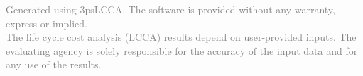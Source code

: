 \documentclass[12pt]{article}
\begin{document}
\begin{titlepage}
\vspace{1.2cm}


\vspace{0.5cm}

{\raggedright
\small
\textcolor{gray}{
Generated using 3psLCCA. The software is provided without any warranty, express or implied.\\
The life cycle cost analysis (LCCA) results depend on user-provided inputs. 
The evaluating agency is solely responsible for the accuracy of the input data and for any use of the results.
}
\par}

\end{titlepage}
\end{document}
